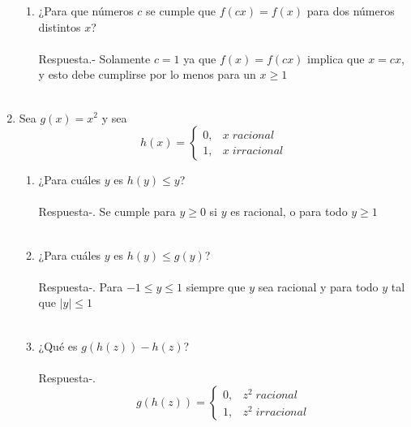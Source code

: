 \begin{enumerate}[\bfseries 1.]
\begin{enumerate}[\bfseries (i)]
		\item ¿Para que números $c$ se cumple que $f(cx)=f(x)$ para dos números distintos $x$?\\\\
		Respuesta.- \;  Solamente $c=1$ ya que $f(x)=f(cx)$ implica que $x=cx$, y esto debe cumplirse por lo menos para un $x \geq 1$\\\\

	    \end{enumerate}

	\item Sea $g(x)=x^2$ y sea 
	\begin{equation*}
	    h(x) = \left\lbrace
		\begin{array}{rl}
		    0, & x \; racional\\
		    1, & x \; irracional
		\end{array}
	    \right.
	\end{equation*}

	\begin{enumerate}[\bfseries (i)]

	    \item ¿Para cuáles $y$ es $h(y) \leq y$?\\\\
	    Respuesta-. \; Se cumple para $y\geq 0$ si $y$ es racional, o para todo $y\geq 1$\\\\

	    \item ¿Para cuáles $y$ es $h(y) \leq g(y)$?\\\\
	    Respuesta-. \; Para $-1\leq y \leq 1$ siempre que $y$ sea racional y para todo $y$ tal que $|y|\leq1$\\\\

	    \item ¿Qué es $g(h(z)) - h(z)$?\\\\
	    Respuesta-. \; 
	    \begin{equation*}
		g(h(z)) = \left\lbrace
		    \begin{array}{rl}
			0, & z^2 \; racional\\
			1, & z^2 \; irracional
		    \end{array}
		\right.
	    \end{equation*}


\end{enumerate}
\end{enumerate}
